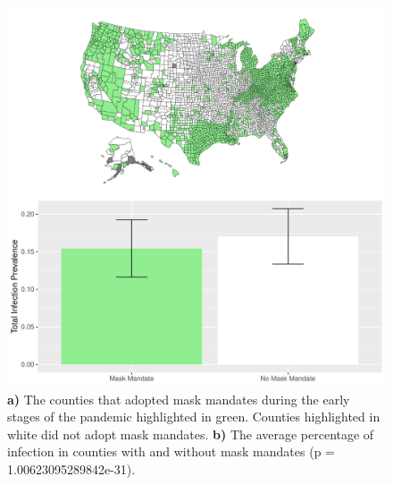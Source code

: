 \documentclass[
  12pt,
]{article}
\begin{document}
\begin{figure}[H]

{\centering \includegraphics{Final-Manuscript_files/figure-latex/fig3-1} 

}

\caption{\textbf{a)} The counties that adopted mask mandates during the early stages of the pandemic highlighted in green. Counties highlighted in white did not adopt mask mandates. \textbf{b)} The average percentage of infection in counties with and without mask mandates (p = 1.00623095289842e-31).}\label{fig:fig3}
\end{figure}
\end{document}
